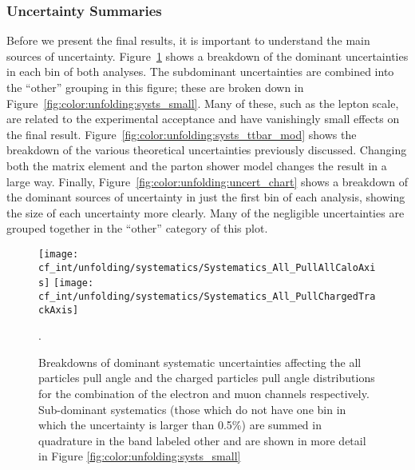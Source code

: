 \subsubsection{Uncertainty Summaries}

	
	Before we present the final results, it is important to understand the main sources of uncertainty. Figure~\ref{fig:color:unfolding:systs_combined} shows a breakdown of the dominant uncertainties in each bin of both analyses. The subdominant uncertainties are combined into the ``other'' grouping in this figure; these are broken down in Figure~\ref{fig:color:unfolding:systs_small}. Many of these, such as the lepton scale, are related to the experimental acceptance and have vanishingly small effects on the final result. Figure~\ref{fig:color:unfolding:systs_ttbar_mod} shows the breakdown of the various theoretical uncertainties previously discussed. Changing both the matrix element and the parton shower model changes the result in a large way. Finally, Figure~\ref{fig:color:unfolding:uncert_chart} shows a breakdown of the dominant sources of uncertainty in just the first bin of each analysis, showing the size of each uncertainty more clearly. Many of the negligible uncertainties are grouped together in the ``other'' category of this plot.


\begin{figure}[htb]
  \texttt{[image: cf\_int/unfolding/systematics/Systematics\_All\_PullAllCaloAxis]}
  \texttt{[image: cf\_int/unfolding/systematics/Systematics\_All\_PullChargedTrackAxis]} \\
  \caption{Breakdowns of dominant systematic uncertainties affecting the all
    particles pull angle and the charged particles pull angle distributions for
    the combination of the electron and muon channels respectively. Sub-dominant systematics
    (those which do not have one bin in which the uncertainty is larger than
    0.5\%) are summed in quadrature in the band labeled other
    and are shown in more detail
    in Figure \ref{fig:color:unfolding:systs_small}}.
  \label{fig:color:unfolding:systs_combined}
\end{figure}



